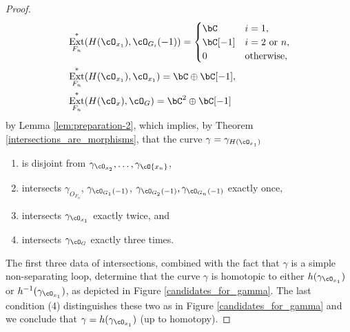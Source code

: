 \documentclass{amsart}
\numberwithin{equation}{section}
\theoremstyle{plain}
\theoremstyle{definition}
\DeclareMathOperator{\Ext}{\mathrm{Ext}}
\begin{document}
\begin{proof}
\begin{align}
         & \Ext^*_{F_n}(H(\cO_{x_1}), \cO_{G_i}(-1)) = \begin{cases}
                                                           \bC     & i = 1,               \\
                                                           \bC[-1] & i = 2 \text{ or } n, \\
                                                           0       & \text{otherwise},
                                                       \end{cases} \\
         & \Ext^*_{F_n}(H(\cO_{x_1}), \cO_{x_1}) = \bC \oplus \bC[-1],                \\
         & \Ext^*_{F_n}(H(\cO_{x}), \cO_{G}) = \bC^2 \oplus \bC[-1]
    \end{align}
    by Lemma \ref{lem:preparation-2}, which implies, by Theorem \ref{intersections_are_morphisms},
    that the curve $\gamma = \gamma_{H(\cO_{x_1})}$
    \begin{enumerate}
        \item is disjoint from $\gamma_{\cO_{x_2}}, \dots, \gamma_{\cO{x_n}}$,
        \item intersects
              $\gamma_{O_{F_n}}$, $\gamma_{\cO_{G_1}(-1)}$,
              $\gamma_{\cO_{G_2}(-1)}, \gamma_{\cO_{G_n}(-1)}$ exactly once,
        \item intersects $\gamma_{\cO_{x_1}}$ exactly twice, and
        \item intersects $\gamma_{\cO_{G}}$ exactly three times.
    \end{enumerate}
    The first three data of intersections, combined with the fact that $\gamma$ is a simple non-separating loop, determine that the curve $\gamma$ is homotopic to either $h(\gamma_{\cO_{x_1}})$ or $h^{-1}(\gamma_{\cO_{x_1}})$, as depicted in Figure \ref{candidates_for_gamma}.
    The last condition (4) distinguishes these two as in Figure \ref{candidates_for_gamma} and we conclude that $\gamma = h(\gamma_{\cO_{x_1}})$ (up to homotopy).


\end{proof}
\end{document}
